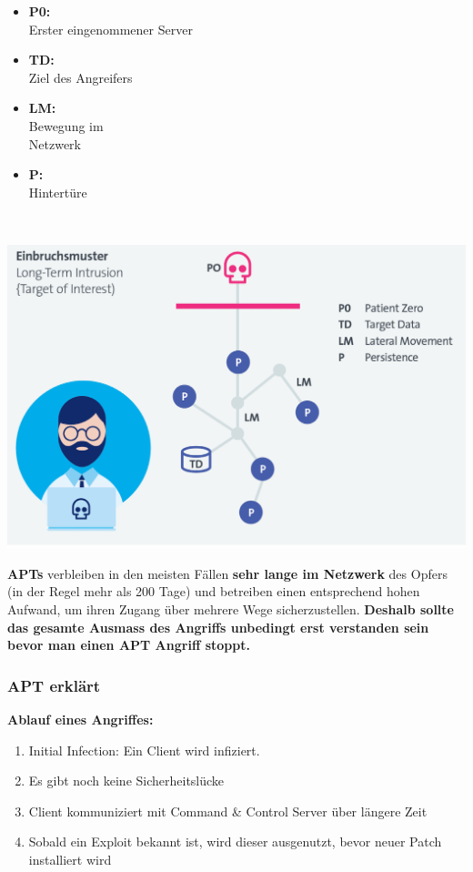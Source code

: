 \begin{minipage}{0.3\linewidth}
    \begin{itemize}
        \item \textbf{P0:}\\ Erster eingenommener Server
        \item \textbf{TD:}\\ Ziel des Angreifers
        \item \textbf{LM:}\\ Bewegung im\\ Netzwerk
        \item \textbf{P:}\\ Hintertüre
    \end{itemize}
    \vfill
    $ $
\end{minipage}
\begin{minipage}{0.7\linewidth}
    \begin{center}
        \includegraphics[width=\linewidth]{./img/01_cyber-defense/apt}
    \end{center}
\end{minipage}


\textbf{APTs} verbleiben in den meisten Fällen \textbf{sehr lange im Netzwerk} des Opfers (in der Regel mehr als 200 Tage) und betreiben einen entsprechend hohen Aufwand, um ihren Zugang über mehrere Wege sicherzustellen.
\textbf{Deshalb sollte das gesamte Ausmass des Angriffs unbedingt erst verstanden sein bevor man einen APT Angriff stoppt.}


\subsubsection{APT erklärt}
\textbf{Ablauf eines Angriffes:}
\begin{enumerate}
    \item Initial Infection: Ein Client wird infiziert.
    \item Es gibt noch keine Sicherheitslücke
    \item Client kommuniziert mit Command \& Control Server über längere Zeit
    \item Sobald ein Exploit bekannt ist, wird dieser ausgenutzt, bevor neuer Patch installiert wird
\end{enumerate}

